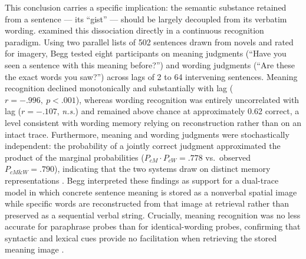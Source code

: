 \documentclass[12pt, a4paper]{article}
\begin{document}
This conclusion carries a specific implication: the semantic substance retained
from a sentence — its ``gist'' — should be largely decoupled from its verbatim
wording. \citet{begg1971} examined this dissociation directly in a continuous
recognition paradigm. Using two parallel lists of 502 sentences drawn from
novels and rated for imagery, Begg tested eight participants on meaning judgments
(``Have you seen a sentence with this meaning before?'') and wording judgments
(``Are these the exact words you saw?'') across lags of 2 to 64 intervening
sentences. Meaning recognition declined monotonically and substantially with lag
(\(r = -.996,\ p < .001\)), whereas wording recognition was entirely uncorrelated
with lag (\(r = -.107\), \textit{n.s.}) and remained above chance at approximately
0.62 correct, a level consistent with wording memory relying on reconstruction
rather than on an intact trace. Furthermore, meaning and wording judgments
were stochastically independent: the probability of a jointly correct judgment
approximated the product of the marginal probabilities
(\(P_{cM} \cdot P_{cW} = .778\) vs.\ observed \(P_{cM\&W} = .790\)),
indicating that the two systems draw on distinct memory representations
\citep{begg1971}. Begg interpreted these findings as support for a dual-trace
model in which concrete sentence meaning is stored as a nonverbal spatial image
while specific words are reconstructed from that image at retrieval rather than
preserved as a sequential verbal string. Crucially, meaning recognition was no
less accurate for paraphrase probes than for identical-wording probes, confirming
that syntactic and lexical cues provide no facilitation when retrieving the stored
meaning image \citep{begg1971}.
\end{document}
